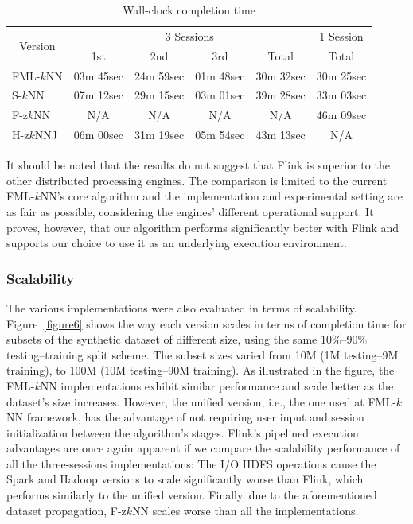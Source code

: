 \begin{table}[!ht]
\centering
\caption{Wall-clock completion time}
\label{table1}
\begin{small}
\begin{tabular}{l|c|c|c|c||c}
\multicolumn{1}{c|}{\multirow{2}{*}{Version}} & \multicolumn{4}{c||}{3 Sessions}             & 1 Session  \\ \cline{2-6} 
\multicolumn{1}{c|}{}                         & 1st      & 2nd      & 3rd      & Total    & Total    \\ \hline
FML-$k$NN                                         & 03m 45sec & 24m 59sec & 01m 48sec & 30m 32sec & 30m 25sec \\ \hline
S-$k$NN                                         & 07m 12sec & 29m 15sec & 03m 01sec & 39m 28sec & 33m 03sec \\ \hline
F-z$k$NN                                         & N/A & N/A & N/A & N/A & 46m 09sec \\ \hline
H-z$k$NNJ                                       & 06m 00sec & 31m 19sec & 05m 54sec & 43m 13sec & N/A     
\end{tabular}
\end{small}
\end{table}

It should be noted that the results do not suggest that Flink is superior to the other distributed processing engines. The comparison is limited to the current FML-$k$NN's core algorithm and the implementation and experimental setting are as fair as possible, considering the engines' different operational support. It proves, however, that our algorithm performs significantly better with Flink and supports our choice to use it as an underlying execution environment.

\subsubsection{Scalability}
\label{subsubsec:scalability}
The various implementations were also evaluated in terms of scalability. Figure~\ref{figure6} shows the way each version scales in terms of completion time for subsets of the synthetic dataset of different size, using the same 10\%--90\% testing--training split scheme. The subset sizes varied from 10M (1M testing--9M training), to 100M (10M testing--90M training). As illustrated in the figure, the FML-$k$NN implementations exhibit similar performance and scale better as the dataset's size increases. However, the unified version, i.e., the one used at FML-$k$NN framework, has the advantage of not requiring user input and session initialization between the algorithm's stages. Flink's pipelined execution advantages are once again apparent if we compare the scalability performance of all the three-sessions implementations: The I/O HDFS operations cause the Spark and Hadoop versions to scale significantly worse than Flink, which performs similarly to the unified version. Finally, due to the aforementioned dataset propagation, F-z$k$NN scales worse than all the implementations.

